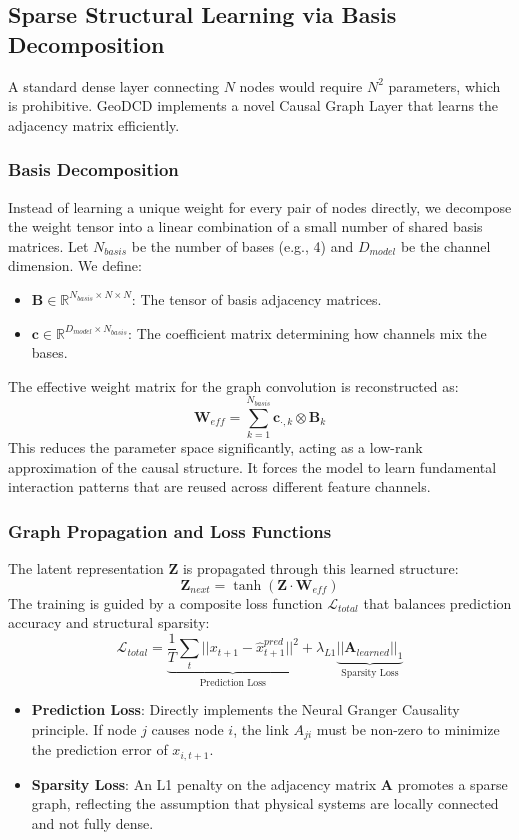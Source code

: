 \documentclass{article}
\begin{document}
\subsection{Sparse Structural Learning via Basis Decomposition}
A standard dense layer connecting $N$ nodes would require $N^2$ parameters, which is prohibitive. GeoDCD implements a novel Causal Graph Layer that learns the adjacency matrix efficiently.
\subsubsection{Basis Decomposition}
Instead of learning a unique weight for every pair of nodes directly, we decompose the weight tensor into a linear combination of a small number of shared basis matrices. Let $N_{basis}$ be the number of bases (e.g., 4) and $D_{model}$ be the channel dimension.
We define:
\begin{itemize}
    \item $\mathbf{B} \in \mathbb{R}^{N_{basis} \times N \times N}$: The tensor of basis adjacency matrices.
    \item $\mathbf{c} \in \mathbb{R}^{D_{model} \times N_{basis}}$: The coefficient matrix determining how channels mix the bases.
\end{itemize}
The effective weight matrix for the graph convolution is reconstructed as:
\begin{equation}
\mathbf{W}_{eff} = \sum_{k=1}^{N_{basis}} \mathbf{c}_{\cdot, k} \otimes \mathbf{B}_{k}
\end{equation}
This reduces the parameter space significantly, acting as a low-rank approximation of the causal structure. It forces the model to learn fundamental interaction patterns that are reused across different feature channels.
\subsubsection{Graph Propagation and Loss Functions}
The latent representation $\mathbf{Z}$ is propagated through this learned structure:
\begin{equation}
\mathbf{Z}_{next} = \tanh(\mathbf{Z} \cdot \mathbf{W}_{eff})
\end{equation}
The training is guided by a composite loss function $\mathcal{L}_{total}$ that balances prediction accuracy and structural sparsity:
\begin{equation}
\mathcal{L}_{total} = \underbrace{\frac{1}{T}\sum_{t} ||x_{t+1} - \hat{x}_{t+1}^{pred}||^2}_{\text{Prediction Loss}} + \lambda_{L1} \underbrace{||\mathbf{A}_{learned}||_1}_{\text{Sparsity Loss}}
\end{equation}
\begin{itemize}
    \item \textbf{Prediction Loss}: Directly implements the Neural Granger Causality principle. If node $j$ causes node $i$, the link $A_{ji}$ must be non-zero to minimize the prediction error of $x_{i, t+1}$.
    \item \textbf{Sparsity Loss}: An L1 penalty on the adjacency matrix $\mathbf{A}$ promotes a sparse graph, reflecting the assumption that physical systems are locally connected and not fully dense.
\end{itemize}
\end{document}

